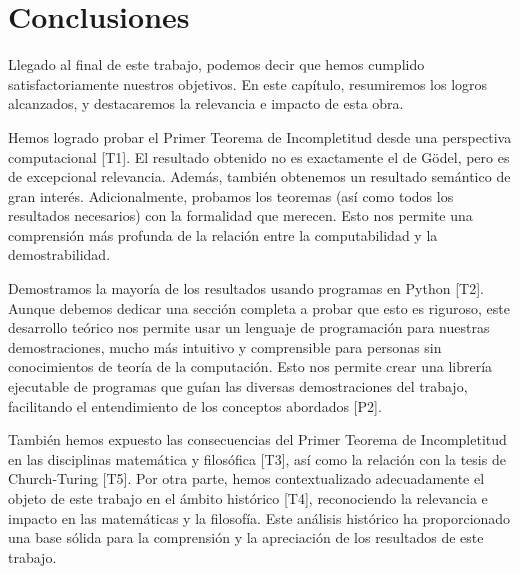 
\vspace{28pt}

\chapter{Conclusiones}\label{ch:conclusiones}

Llegado al final de este trabajo, podemos decir que hemos cumplido satisfactoriamente nuestros objetivos. En este capítulo, resumiremos los logros alcanzados, y destacaremos la relevancia e impacto de esta obra.

Hemos logrado probar el Primer Teorema de Incompletitud desde una perspectiva computacional [T1]. El resultado obtenido no es exactamente el de Gödel, pero es de excepcional relevancia. Además, también obtenemos un resultado semántico de gran interés. Adicionalmente, probamos los teoremas (así como todos los resultados necesarios) con la formalidad que merecen. Esto nos permite una comprensión más profunda de la relación entre la computabilidad y la demostrabilidad.

Demostramos la mayoría de los resultados usando programas en Python [T2]. Aunque debemos dedicar una sección completa a probar que esto es riguroso, este desarrollo teórico nos permite usar un lenguaje de programación para nuestras demostraciones, mucho más intuitivo y comprensible para personas sin conocimientos de teoría de la computación. Esto nos permite crear una librería ejecutable de programas que guían las diversas demostraciones del trabajo, facilitando el entendimiento de los conceptos abordados [P2].

También hemos expuesto las consecuencias del Primer Teorema de Incompletitud en las disciplinas matemática y filosófica [T3], así como la relación con la tesis de Church-Turing [T5]. Por otra parte, hemos contextualizado adecuadamente el objeto de este trabajo en el ámbito histórico [T4], reconociendo la relevancia e impacto en las matemáticas y la filosofía. Este análisis histórico ha proporcionado una base sólida para la comprensión y la apreciación de los resultados de este trabajo.

